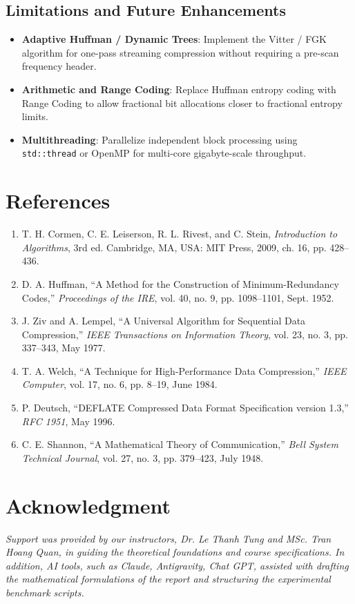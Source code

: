 \documentclass[12pt,a4paper]{article}
\begin{document}
\subsection{Limitations and Future Enhancements}
\begin{itemize}
    \item \textbf{Adaptive Huffman / Dynamic Trees}: Implement the Vitter / FGK algorithm for one-pass streaming compression without requiring a pre-scan frequency header.
    \item \textbf{Arithmetic and Range Coding}: Replace Huffman entropy coding with Range Coding to allow fractional bit allocations closer to fractional entropy limits.
    \item \textbf{Multithreading}: Parallelize independent block processing using \texttt{std::thread} or OpenMP for multi-core gigabyte-scale throughput.
\end{itemize}

\section{References}
\begin{enumerate}
    \item T. H. Cormen, C. E. Leiserson, R. L. Rivest, and C. Stein, \emph{Introduction to Algorithms}, 3rd ed. Cambridge, MA, USA: MIT Press, 2009, ch. 16, pp. 428--436.
    \item D. A. Huffman, ``A Method for the Construction of Minimum-Redundancy Codes,'' \emph{Proceedings of the IRE}, vol. 40, no. 9, pp. 1098--1101, Sept. 1952.
    \item J. Ziv and A. Lempel, ``A Universal Algorithm for Sequential Data Compression,'' \emph{IEEE Transactions on Information Theory}, vol. 23, no. 3, pp. 337--343, May 1977.
    \item T. A. Welch, ``A Technique for High-Performance Data Compression,'' \emph{IEEE Computer}, vol. 17, no. 6, pp. 8--19, June 1984.
    \item P. Deutsch, ``DEFLATE Compressed Data Format Specification version 1.3,'' \emph{RFC 1951}, May 1996.
    \item C. E. Shannon, ``A Mathematical Theory of Communication,'' \emph{Bell System Technical Journal}, vol. 27, no. 3, pp. 379--423, July 1948.
\end{enumerate}

\section{Acknowledgment}
\textit{Support was provided by our instructors, Dr. Le Thanh Tung and MSc. Tran Hoang Quan, in guiding the theoretical foundations and course specifications. In addition, AI tools, such as Claude, Antigravity, Chat GPT, assisted with drafting the mathematical formulations of the report and structuring the experimental benchmark scripts.}
\end{document}
